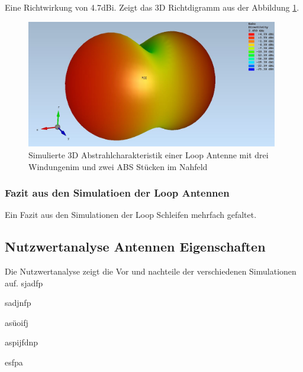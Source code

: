 Eine Richtwirkung von 4.7dBi. Zeigt das 3D Richtdigramm aus der Abbildung \ref{fig:sim_Loop_3Fach_2ABS_3D}.
\begin{figure}[h]
	\centering
	\includegraphics[width=11cm]{content/bilder/Evaluation/Loop/Kurz3/EMFraField_Loop_2ABS_kurz3.JPG}%
	\caption{Simulierte 3D Abstrahlcharakteristik einer Loop Antenne mit  drei Windungenim und zwei ABS Stücken im Nahfeld}
	\label{fig:sim_Loop_3Fach_2ABS_3D}
\end{figure}
\newpage
\subsubsection{Fazit aus den Simulatioen der Loop Antennen}
Ein Fazit aus den Simulationen der Loop Schleifen mehrfach gefaltet.


\subsection{Nutzwertanalyse Antennen Eigenschaften }
Die Nutzwertanalyse zeigt die Vor und nachteile der verschiedenen Simulationen auf.
sjadfp

sadjnfp

asüoifj

aspijfdnp

esfpa

